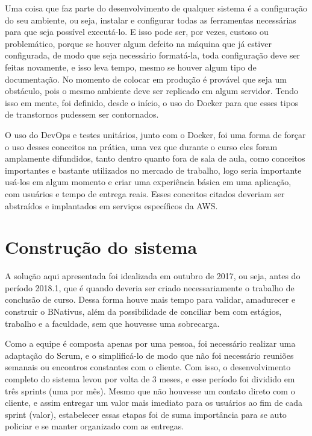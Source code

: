Uma coisa que faz parte do desenvolvimento de qualquer sistema é a configuração do seu ambiente, ou seja, instalar e configurar todas as ferramentas necessárias para que seja possível executá-lo. E isso pode ser, por vezes, custoso ou problemático, porque se houver algum defeito na máquina que já estiver configurada, de modo que seja necessário formatá-la, toda configuração deve ser feitas novamente, e isso leva tempo, mesmo se houver algum tipo de documentação. No momento de colocar em produção é provável que seja um obstáculo, pois o mesmo ambiente deve ser replicado em algum servidor. Tendo isso em mente, foi definido, desde o início, o uso do Docker para que esses tipos de transtornos pudessem ser contornados.

O uso do DevOps e testes unitários, junto com o Docker, foi uma forma de forçar o uso desses conceitos na prática, uma vez que durante o curso eles foram amplamente difundidos, tanto dentro quanto fora de sala de aula, como conceitos importantes e bastante utilizados no mercado de trabalho, logo seria importante usá-los em algum momento e criar uma experiência básica em uma aplicação, com usuários e tempo de entrega reais. Esses conceitos citados deveriam ser abstraídos e implantados em serviços específicos da AWS.

\section{Construção do sistema}

A solução aqui apresentada foi idealizada em outubro de 2017, ou seja, antes do período 2018.1, que é quando deveria ser criado necessariamente o trabalho de conclusão de curso. Dessa forma houve mais tempo para validar, amadurecer e construir o BNativus, além da possibilidade de conciliar bem com estágios, trabalho e a faculdade, sem que houvesse uma sobrecarga.

Como a equipe é composta apenas por uma pessoa, foi necessário realizar uma adaptação do Scrum, e o simplificá-lo de modo que não foi necessário reuniões semanais ou encontros constantes com o cliente. Com isso, o desenvolvimento completo do sistema levou por volta de 3 meses, e esse período foi dividido em três sprints (uma por mês). Mesmo que não houvesse um contato direto com o cliente, e assim entregar um valor mais imediato para os usuários ao fim de cada sprint (valor), estabelecer essas etapas foi de suma importância para se auto policiar e se manter organizado com as entregas.

